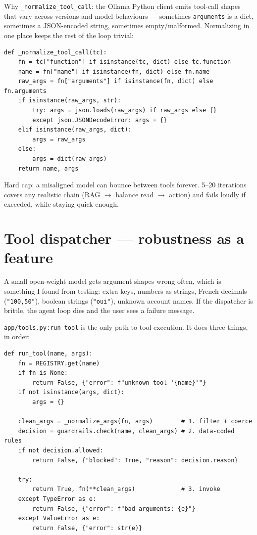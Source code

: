 \documentclass[11pt]{article}
\begin{document}
Why \texttt{\_normalize\_tool\_call}: the Ollama Python client emits tool-call shapes that vary across versions and model behaviours --- sometimes \texttt{arguments} is a dict, sometimes a JSON-encoded string, sometimes empty/malformed. Normalizing in one place keeps the rest of the loop trivial:

\begin{lstlisting}[style=py]
def _normalize_tool_call(tc):
    fn = tc["function"] if isinstance(tc, dict) else tc.function
    name = fn["name"] if isinstance(fn, dict) else fn.name
    raw_args = fn["arguments"] if isinstance(fn, dict) else fn.arguments
    if isinstance(raw_args, str):
        try: args = json.loads(raw_args) if raw_args else {}
        except json.JSONDecodeError: args = {}
    elif isinstance(raw_args, dict):
        args = raw_args
    else:
        args = dict(raw_args)
    return name, args
\end{lstlisting}

Hard cap: a misaligned model can bounce between tools forever. 5--20 iterations covers any realistic chain (RAG $\rightarrow$ balance read $\rightarrow$ action) and fails loudly if exceeded, while staying quick enough.

\section{Tool dispatcher --- robustness as a feature}

A small open-weight model gets argument shapes wrong often, which is something I found from testing: extra keys, numbers as strings, French decimals (\texttt{"100,50"}), boolean strings (\texttt{"oui"}), unknown account names. If the dispatcher is brittle, the agent loop dies and the user sees a failure message.

\texttt{app/tools.py:run\_tool} is the only path to tool execution. It does three things, in order:

\begin{lstlisting}[style=py]
def run_tool(name, args):
    fn = REGISTRY.get(name)
    if fn is None:
        return False, {"error": f"unknown tool '{name}'"}
    if not isinstance(args, dict):
        args = {}

    clean_args = _normalize_args(fn, args)        # 1. filter + coerce
    decision = guardrails.check(name, clean_args) # 2. data-coded rules
    if not decision.allowed:
        return False, {"blocked": True, "reason": decision.reason}

    try:
        return True, fn(**clean_args)             # 3. invoke
    except TypeError as e:
        return False, {"error": f"bad arguments: {e}"}
    except ValueError as e:
        return False, {"error": str(e)}
\end{lstlisting}
\end{document}
